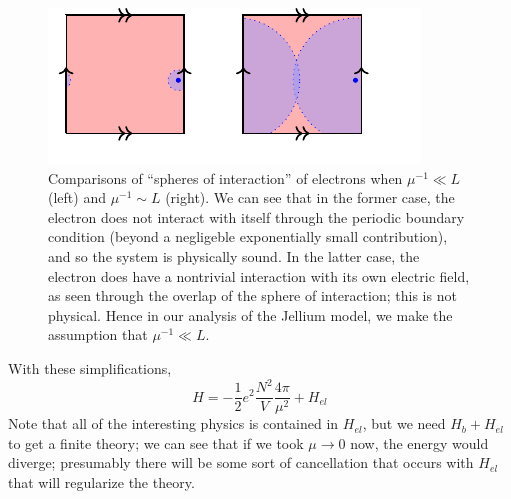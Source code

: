\begin{figure}[htbp]
    \centering
    \includegraphics[]{Images/fig-jelliumlengthassumption.pdf}
    
    \caption{Comparisons of ``spheres of interaction'' of electrons when $\mu^{-1} \ll L$ (left) and $\mu^{-1} \sim L$ (right). We can see that in the former case, the electron does not interact with itself through the periodic boundary condition (beyond a negligeble exponentially small contribution), and so the system is physically sound. In the latter case, the electron does have a nontrivial interaction with its own electric field, as seen through the overlap of the sphere of interaction; this is not physical. Hence in our analysis of the Jellium model, we make the assumption that $\mu^{-1} \ll L$.}
    \label{fig-jelliumlengthassumption}
\end{figure}

With these simplifications, 
\begin{equation}
    H = -\frac{1}{2}e^2\frac{N^2}{V}\frac{4\pi}{\mu^2} + H_{el}
\end{equation}
Note that all of the interesting physics is contained in $H_{el}$, but we need $H_b + H_{el}$ to get a finite theory; we can see that if we took $\mu \to 0$ now, the energy would diverge; presumably there will be some sort of cancellation that occurs with $H_{el}$ that will regularize the theory. 

